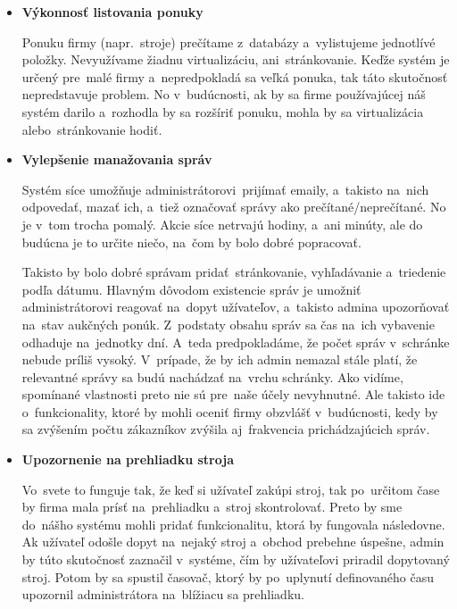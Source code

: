 \begin{itemize}
\item \textbf{Výkonnosť listovania ponuky}

Ponuku firmy (napr.~stroje) prečítame z~databázy a~vylistujeme jednotlívé položky. Nevyužívame žiadnu virtualizáciu, ani~stránkovanie. Keďže systém je určený pre~malé firmy a~nepredpokladá sa veľká ponuka, tak táto skutočnosť nepredstavuje problem. No v~budúcnosti, ak by sa firme používajúcej náš systém darilo a~rozhodla by sa rozšíriť ponuku, mohla by sa virtualizácia alebo~stránkovanie hodiť.

\item \textbf{Vylepšenie manažovania správ}

Systém síce umožňuje administrátorovi~prijímať emaily, a~takisto na~nich odpovedať, mazať ich, a~tiež označovať správy ako prečítané/neprečítané. No je v~tom trocha pomalý. Akcie síce netrvajú hodiny, a~ani minúty, ale do budúcna je to určite niečo, na~čom by bolo dobré popracovať.

Takisto by bolo dobré správam pridať~stránkovanie, vyhľadávanie a~triedenie podľa dátumu. Hlavným dôvodom existencie správ je umožniť administrátorovi reagovať na~dopyt užívateľov, a~takisto admina upozorňovať na~stav aukčných ponúk. Z~podstaty obsahu správ sa čas na~ich vybavenie odhaduje na~jednotky dní. A~teda predpokladáme, že počet správ v~schránke nebude príliš vysoký. V~prípade, že by ich admin nemazal stále platí, že relevantné správy sa budú nachádzať na~vrchu schránky. Ako vidíme, spomínané vlastnosti preto nie sú pre~naše účely nevyhnutné. Ale takisto ide o~funkcionality, ktoré by mohli oceniť firmy obzvlášť v~budúcnosti, kedy by sa zvýšením počtu zákazníkov zvýšila aj~frakvencia prichádzajúcich správ.

\item \textbf{Upozornenie na prehliadku stroja}

Vo~svete to funguje tak, že keď si užívateľ zakúpi stroj, tak po~určitom čase by firma mala prísť na~prehliadku a~stroj skontrolovať. Preto by sme do~nášho systému mohli pridať funkcionalitu, ktorá by fungovala následovne. Ak užívateľ odošle dopyt na~nejaký stroj a~obchod prebehne úspešne, admin by túto skutočnosť zaznačil v~systéme, čím by užívateľovi priradil dopytovaný stroj. Potom by sa spustil časovač, ktorý by po~uplynutí definovaného času upozornil administrátora na~blížiacu sa prehliadku.

\end{itemize}
